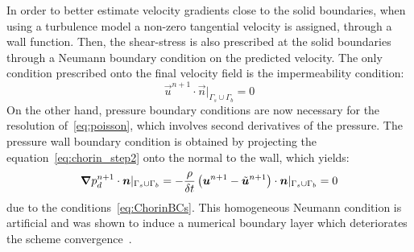 In order to better estimate velocity gradients close to the solid boundaries, when using a turbulence model a non-zero tangential velocity is assigned,
through a wall function. Then, the shear-stress is also prescribed at the solid boundaries through a Neumann boundary condition on the predicted velocity.
The only condition prescribed onto the final velocity field is the impermeability condition:
\begin{equation}\label{eq:ChorinBCs}
      \vec{u}^{n+1}\cdot\vec{n}|_{\Gamma_s\cup\Gamma_b} = 0
\end{equation}
On the other hand, pressure boundary conditions are now necessary for the resolution of~\eqref{eq:poisson}, which involves second derivatives of the pressure.
The pressure wall boundary condition is obtained by projecting the equation~\eqref{eq:chorin_step2} onto the normal to the wall,
which yields:
\begin{equation}\label{eq:pressureHomogeneousNeumann}
  \bm{\nabla} p_d^{n+1} \cdot \bm{n}|_{\Gamma_s\cup\Gamma_b} = -\dfrac{\rho}{\delta t}\left(\bm{u}^{n+1}-\tilde{\bm{u}}^{n+1}\right) \cdot \bm{n}|_{\Gamma_s\cup\Gamma_b} = 0
\end{equation}
due to the conditions~\eqref{eq:ChorinBCs}.
This homogeneous Neumann condition is artificial and was shown to induce a numerical boundary layer which deteriorates the scheme convergence~\cite{Rannacher1992}.

